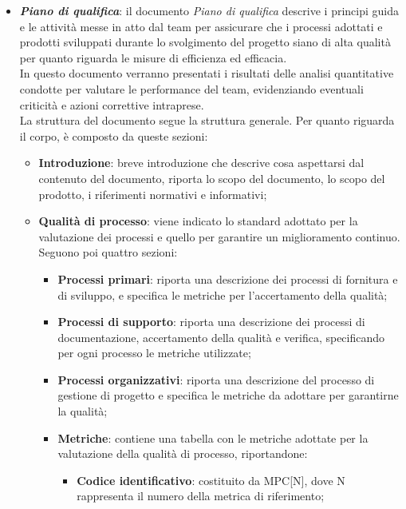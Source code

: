 \begin{itemize}
    \item \textit{\textbf{Piano di qualifica}}: il documento \textit{Piano di qualifica} descrive i principi guida e le attività messe in atto dal team per assicurare che i processi adottati e prodotti sviluppati durante lo svolgimento del progetto siano di alta qualità per quanto riguarda le misure di efficienza ed efficacia.\\
          In questo documento verranno presentati i risultati delle analisi quantitative condotte per valutare le performance del team, evidenziando eventuali criticità e azioni correttive intraprese.
          \\La struttura del documento segue la struttura generale. Per quanto riguarda il corpo, è composto da queste sezioni:
          \begin{itemize}
              \item \textbf{Introduzione}: breve introduzione che descrive cosa aspettarsi dal contenuto del documento, riporta lo scopo del documento, lo scopo del prodotto, i riferimenti normativi e informativi;
              \item \textbf{Qualità di processo}: viene indicato lo standard adottato per la valutazione dei processi e quello per garantire un miglioramento continuo.\\
                    Seguono poi quattro sezioni:
                    \begin{itemize}
                        \item \textbf{Processi primari}: riporta una descrizione dei processi di fornitura e di sviluppo, e specifica le metriche per l'accertamento della qualità;
                        \item \textbf{Processi di supporto}: riporta una descrizione dei processi di documentazione, accertamento della qualità e verifica, specificando per ogni processo le metriche utilizzate;
                        \item \textbf{Processi organizzativi}: riporta una descrizione del processo di gestione di progetto e specifica le metriche da adottare per garantirne la qualità;
                        \item \textbf{Metriche}: contiene una tabella con le metriche adottate per la valutazione della qualità di processo, riportandone:
                              \begin{itemize}
                                  \item \textbf{Codice identificativo}: costituito da MPC[N], dove N rappresenta il numero della metrica di riferimento;

\end{itemize}
\end{itemize}
\end{itemize}
\end{itemize}
